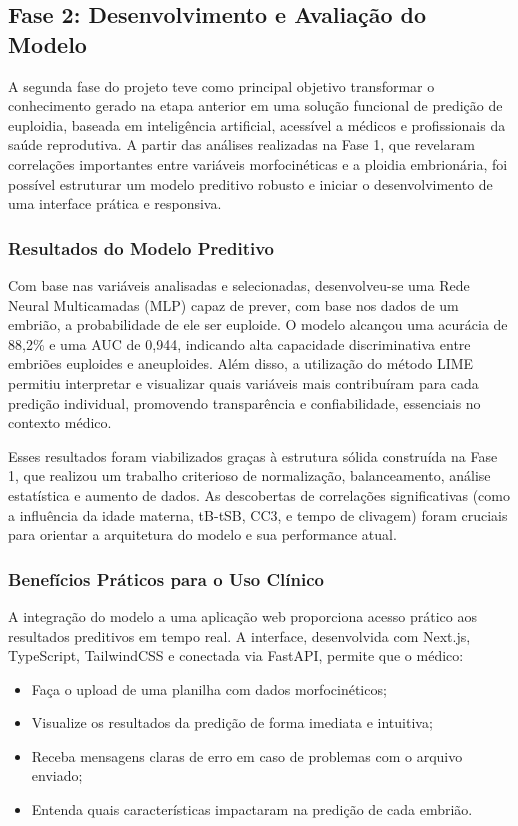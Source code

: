 \subsection{Fase 2:  Desenvolvimento e Avaliação do Modelo}
A segunda fase do projeto teve como principal objetivo transformar o conhecimento gerado na etapa anterior em uma solução funcional de predição de euploidia, baseada em inteligência artificial, acessível a médicos e profissionais da saúde reprodutiva. A partir das análises realizadas na Fase 1, que revelaram correlações importantes entre variáveis morfocinéticas e a ploidia embrionária, foi possível estruturar um modelo preditivo robusto e iniciar o desenvolvimento de uma interface prática e responsiva.

\subsubsection{Resultados do Modelo Preditivo}
Com base nas variáveis analisadas e selecionadas, desenvolveu-se uma Rede Neural Multicamadas (MLP) capaz de prever, com base nos dados de um embrião, a probabilidade de ele ser euploide. O modelo alcançou uma acurácia de 88,2\% e uma AUC de 0,944, indicando alta capacidade discriminativa entre embriões euploides e aneuploides. Além disso, a utilização do método LIME permitiu interpretar e visualizar quais variáveis mais contribuíram para cada predição individual, promovendo transparência e confiabilidade, essenciais no contexto médico.

Esses resultados foram viabilizados graças à estrutura sólida construída na Fase 1, que realizou um trabalho criterioso de normalização, balanceamento, análise estatística e aumento de dados. As descobertas de correlações significativas (como a influência da idade materna, tB-tSB, CC3, e tempo de clivagem) foram cruciais para orientar a arquitetura do modelo e sua performance atual.

\subsubsection{Benefícios Práticos para o Uso Clínico}
A integração do modelo a uma aplicação web proporciona acesso prático aos resultados preditivos em tempo real. A interface, desenvolvida com Next.js, TypeScript, TailwindCSS e conectada via FastAPI, permite que o médico:
\begin{itemize}
    \item Faça o upload de uma planilha com dados morfocinéticos;

    \item Visualize os resultados da predição de forma imediata e intuitiva;

    \item Receba mensagens claras de erro em caso de problemas com o arquivo enviado;

    \item Entenda quais características impactaram na predição de cada embrião.
\end{itemize}

